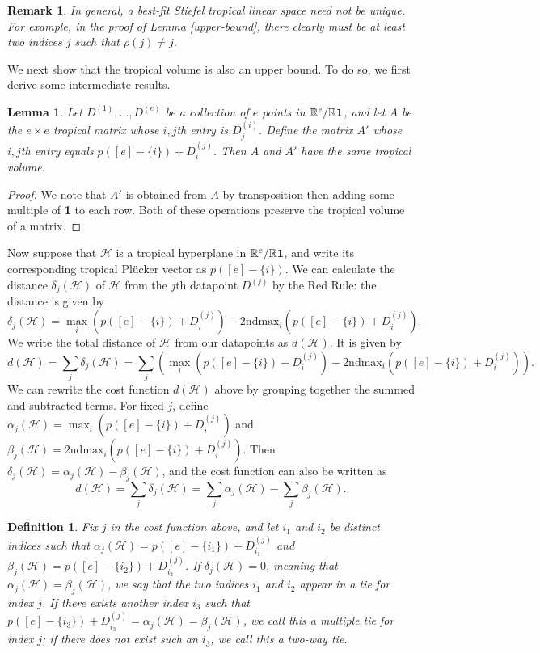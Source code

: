 \documentclass[12pt]{extarticle}
\numberwithin{theorem}{section}
\newtheorem{lemma}[theorem]{Lemma}
\newtheorem{definition}[theorem]{Definition}
\newtheorem{remark}[theorem]{Remark}
\newcommand{\RR}{\mathbb{R}}
\begin{document}
\begin{remark}
In general, a best-fit Stiefel tropical linear space need not be unique. For example, in the proof of Lemma \ref{upper-bound}, there clearly must be at least two indices $j$ such that $\rho(j)\neq j$.
\end{remark}

We next show that the tropical volume is also an upper bound. To do so, we first derive some intermediate results.

\begin{lemma}
\label{same-tropical-volume}
Let $D^{(1)},\ldots, D^{(e)}$ be a collection of $e$ points in $\RR^e/\RR {\bf 1}$, and let $A$ be the $e\times e$ tropical matrix whose $i,j$th entry is $D^{(i)}_j$. Define the matrix $A'$ whose $i,j$th entry equals $p([e]-\{i\}) + D^{(j)}_i$. Then $A$ and $A'$ have the same tropical volume.
\end{lemma}
\begin{proof}
We note that $A'$ is obtained from $A$ by transposition then adding some multiple of {\bf 1} to each row. Both of these operations preserve the tropical volume of a matrix.
\end{proof}

Now suppose that $\mathcal H$ is a tropical hyperplane in $\RR^e/\RR {\bf 1}$, and write its corresponding tropical Pl\"ucker vector as $p([e]-\{i\})$. We can calculate the distance $\delta_j(\mathcal H)$ of $\mathcal H$ from the $j$th datapoint $D^{(j)}$ by the Red Rule: the distance is given by
\[\delta_j(\mathcal H) = \max_i(p([e]-\{i\}) + D^{(j)}_i) - \text{2ndmax}_i (p([e]-\{i\}) + D^{(j)}_i).\]
We write the total distance of $\mathcal H$ from our datapoints as $d(\mathcal H)$. It is given by
\[d(\mathcal H)=\sum_j \delta_j(\mathcal H) = \sum_j \left(\max_i(p([e]-\{i\}) + D^{(j)}_i) - \text{2ndmax}_i (p([e]-\{i\}) + D^{(j)}_i)\right).\]
We can rewrite the cost function $d(\mathcal H)$ above by grouping together the summed and subtracted terms. For fixed $j$, define $\alpha_j(\mathcal H) = \max_i(p([e]-\{i\}) + D^{(j)}_i)$ and $\beta_j(\mathcal H) = \text{2ndmax}_i (p([e]-\{i\}) + D^{(j)}_i)$. Then $\delta_j(\mathcal H) = \alpha_j(\mathcal H)-\beta_j(\mathcal H)$, and the cost function can also be written as
\[d(\mathcal H) = \sum_j \delta_j(\mathcal H) =\sum_j \alpha_j(\mathcal H) - \sum_j \beta_j(\mathcal H).\]

\begin{definition}
Fix $j$ in the cost function above, and let $i_1$ and $i_2$ be distinct indices such that $\alpha_j(\mathcal H) = p([e]-\{i_1\})+D^{(j)}_{i_1}$ and $\beta_j(\mathcal H) = p([e]-\{i_2\})+D^{(j)}_{i_2}$. If $\delta_j(\mathcal H)=0$, meaning that $\alpha_j(\mathcal H)=\beta_j(\mathcal H)$, we say that the two indices $i_1$ and $i_2$ \emph{appear in a tie} for index $j$. If there exists another index $i_3$ such that $p([e]-\{i_3\}) + D^{(j)}_{i_3}=\alpha_j(\mathcal H) = \beta_j(\mathcal H)$, we call this a \emph{multiple tie} for index $j$; if there does not exist such an $i_3$, we call this a \emph{two-way tie}.
\end{definition}
\end{document}
